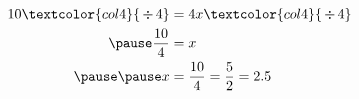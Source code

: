 \documentclass[aspectratio=169,10pt]{beamer}
\begin{document}
\begin{frame}
\begin{solution}[]
\begin{columns}[t]
\begin{column}{.4\textwidth}
\[\begin{aligned}
         10\textcolor{col4}{\,\div\,4}&=4x\textcolor{col4}{\,\div\,4}\\\pause
         \frac{10}{4}&=x\\\pause\pause
         x&=\frac{10}{4}=\frac{5}{2}=2.5
      \end{aligned}
      \]
    \end{column}
  \end{columns}
  \end{solution}
  \vspace{-7pt}
\end{frame}

\addtocounter{example}{-1}
\end{document}
